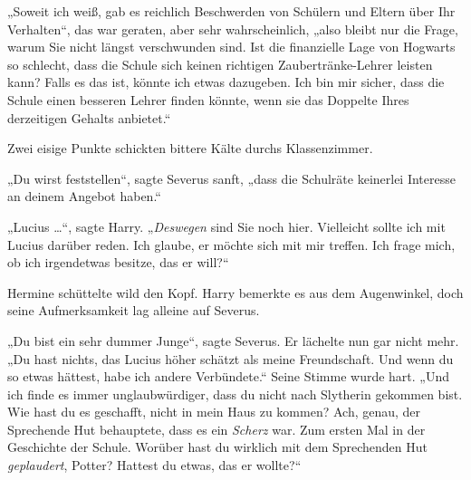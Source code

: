 „Soweit ich weiß, gab es reichlich Beschwerden von Schülern und Eltern über Ihr Verhalten“, das war geraten, aber sehr wahrscheinlich, „also bleibt nur die Frage, warum Sie nicht längst verschwunden sind. Ist die finanzielle Lage von Hogwarts so schlecht, dass die Schule sich keinen richtigen Zaubertränke-Lehrer leisten kann? Falls es das ist, könnte ich etwas dazugeben. Ich bin mir sicher, dass die Schule einen besseren Lehrer finden könnte, wenn sie das Doppelte Ihres derzeitigen Gehalts anbietet.“

Zwei eisige Punkte schickten bittere Kälte durchs Klassenzimmer.

„Du wirst feststellen“, sagte Severus sanft, „dass die Schulräte keinerlei Interesse an deinem Angebot haben.“

„Lucius …“, sagte Harry. „\emph{Deswegen} sind Sie noch hier. Vielleicht sollte ich mit Lucius darüber reden. Ich glaube, er möchte sich mit mir treffen. Ich frage mich, ob ich irgendetwas besitze, das er will?“

Hermine schüttelte wild den Kopf. Harry bemerkte es aus dem Augenwinkel, doch seine Aufmerksamkeit lag alleine auf Severus.

„Du bist ein sehr dummer Junge“, sagte Severus. Er lächelte nun gar nicht mehr. „Du hast nichts, das Lucius höher schätzt als meine Freundschaft. Und wenn du so etwas hättest, habe ich andere Verbündete.“ Seine Stimme wurde hart. „Und ich finde es immer unglaubwürdiger, dass du nicht nach Slytherin gekommen bist. Wie hast du es geschafft, nicht in mein Haus zu kommen? Ach, genau, der Sprechende Hut behauptete, dass es ein \emph{Scherz} war. Zum ersten Mal in der Geschichte der Schule. Worüber hast du wirklich mit dem Sprechenden Hut \emph{geplaudert}, Potter? Hattest du etwas, das er wollte?“

